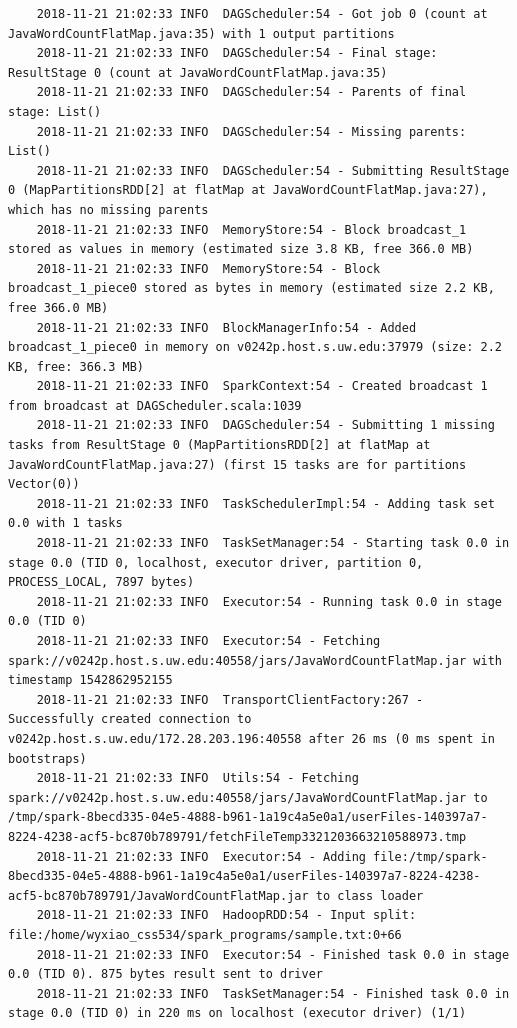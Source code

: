 \documentclass[11pt, letterpaper]{article}
\begin{document}
\begin{lstlisting}
	2018-11-21 21:02:33 INFO  DAGScheduler:54 - Got job 0 (count at JavaWordCountFlatMap.java:35) with 1 output partitions
	2018-11-21 21:02:33 INFO  DAGScheduler:54 - Final stage: ResultStage 0 (count at JavaWordCountFlatMap.java:35)
	2018-11-21 21:02:33 INFO  DAGScheduler:54 - Parents of final stage: List()
	2018-11-21 21:02:33 INFO  DAGScheduler:54 - Missing parents: List()
	2018-11-21 21:02:33 INFO  DAGScheduler:54 - Submitting ResultStage 0 (MapPartitionsRDD[2] at flatMap at JavaWordCountFlatMap.java:27), which has no missing parents
	2018-11-21 21:02:33 INFO  MemoryStore:54 - Block broadcast_1 stored as values in memory (estimated size 3.8 KB, free 366.0 MB)
	2018-11-21 21:02:33 INFO  MemoryStore:54 - Block broadcast_1_piece0 stored as bytes in memory (estimated size 2.2 KB, free 366.0 MB)
	2018-11-21 21:02:33 INFO  BlockManagerInfo:54 - Added broadcast_1_piece0 in memory on v0242p.host.s.uw.edu:37979 (size: 2.2 KB, free: 366.3 MB)
	2018-11-21 21:02:33 INFO  SparkContext:54 - Created broadcast 1 from broadcast at DAGScheduler.scala:1039
	2018-11-21 21:02:33 INFO  DAGScheduler:54 - Submitting 1 missing tasks from ResultStage 0 (MapPartitionsRDD[2] at flatMap at JavaWordCountFlatMap.java:27) (first 15 tasks are for partitions Vector(0))
	2018-11-21 21:02:33 INFO  TaskSchedulerImpl:54 - Adding task set 0.0 with 1 tasks
	2018-11-21 21:02:33 INFO  TaskSetManager:54 - Starting task 0.0 in stage 0.0 (TID 0, localhost, executor driver, partition 0, PROCESS_LOCAL, 7897 bytes)
	2018-11-21 21:02:33 INFO  Executor:54 - Running task 0.0 in stage 0.0 (TID 0)
	2018-11-21 21:02:33 INFO  Executor:54 - Fetching spark://v0242p.host.s.uw.edu:40558/jars/JavaWordCountFlatMap.jar with timestamp 1542862952155
	2018-11-21 21:02:33 INFO  TransportClientFactory:267 - Successfully created connection to v0242p.host.s.uw.edu/172.28.203.196:40558 after 26 ms (0 ms spent in bootstraps)
	2018-11-21 21:02:33 INFO  Utils:54 - Fetching spark://v0242p.host.s.uw.edu:40558/jars/JavaWordCountFlatMap.jar to /tmp/spark-8becd335-04e5-4888-b961-1a19c4a5e0a1/userFiles-140397a7-8224-4238-acf5-bc870b789791/fetchFileTemp3321203663210588973.tmp
	2018-11-21 21:02:33 INFO  Executor:54 - Adding file:/tmp/spark-8becd335-04e5-4888-b961-1a19c4a5e0a1/userFiles-140397a7-8224-4238-acf5-bc870b789791/JavaWordCountFlatMap.jar to class loader
	2018-11-21 21:02:33 INFO  HadoopRDD:54 - Input split: file:/home/wyxiao_css534/spark_programs/sample.txt:0+66
	2018-11-21 21:02:33 INFO  Executor:54 - Finished task 0.0 in stage 0.0 (TID 0). 875 bytes result sent to driver
	2018-11-21 21:02:33 INFO  TaskSetManager:54 - Finished task 0.0 in stage 0.0 (TID 0) in 220 ms on localhost (executor driver) (1/1)

\end{lstlisting}
\end{document}
